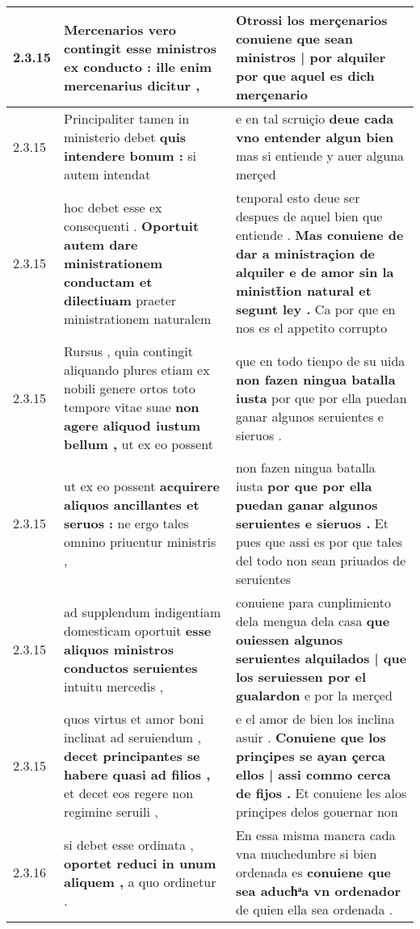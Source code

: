 \begin{tabular}{|p{1cm}|p{6.5cm}|p{6.5cm}|}
2.3.15 & Mercenarios vero contingit \textbf{ esse ministros ex conducto : } ille enim mercenarius dicitur , & Otrossi los merçenarios conuiene \textbf{ que sean ministros | por alquiler } por que aquel es dich merçenario \\\hline
2.3.15 & Principaliter tamen in ministerio debet \textbf{ quis intendere bonum : } si autem intendat & e en tal scruiçio \textbf{ deue cada vno entender algun bien } mas si entiende y auer alguna merçed \\\hline
2.3.15 & hoc debet esse ex consequenti . \textbf{ Oportuit autem dare ministrationem conductam et dilectiuam } praeter ministrationem naturalem & tenporal esto deue ser despues de aquel bien que entiende . \textbf{ Mas conuiene de dar a ministraçion de alquiler e de amor sin la ministt̃ion natural et segunt ley . } Ca por que en nos es el appetito corrupto \\\hline
2.3.15 & Rursus , quia contingit aliquando plures etiam ex nobili genere ortos toto tempore vitae suae \textbf{ non agere aliquod iustum bellum , } ut ex eo possent & que en todo tienpo de su uida \textbf{ non fazen ningua batalla iusta } por que por ella puedan ganar algunos seruientes e sieruos . \\\hline
2.3.15 & ut ex eo possent \textbf{ acquirere aliquos ancillantes et seruos : } ne ergo tales omnino priuentur ministris , & non fazen ningua batalla iusta \textbf{ por que por ella puedan ganar algunos seruientes e sieruos . } Et pues que assi es por que tales del todo non sean priuados de seruientes \\\hline
2.3.15 & ad supplendum indigentiam domesticam oportuit \textbf{ esse aliquos ministros conductos seruientes } intuitu mercedis , & conuiene para cunplimiento dela mengua dela casa \textbf{ que ouiessen algunos seruientes alquilados | que los seruiessen por el gualardon } e por la merçed \\\hline
2.3.15 & quos virtus et amor boni inclinat ad seruiendum , \textbf{ decet principantes se habere quasi ad filios , } et decet eos regere non regimine seruili , & e el amor de bien los inclina asuir . \textbf{ Conuiene que los prinçipes se ayan çerca ellos | assi commo cerca de fijos . } Et conuiene les alos prinçipes delos gouernar non \\\hline
2.3.16 & si debet esse ordinata , \textbf{ oportet reduci in unum aliquem , } a quo ordinetur . & En essa misma manera cada vna muchedunbre si bien ordenada es \textbf{ conuiene que sea aduchͣa vn ordenador } de quien ella sea ordenada . \\\hline

\end{tabular}
